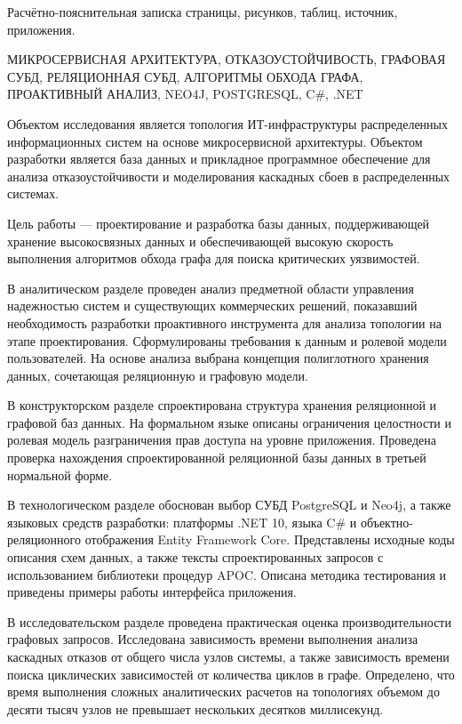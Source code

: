 Расчётно-пояснительная записка \pageref{LastPage} страницы,  рисунков, 
 таблиц,  источник,  приложения.

\noindent
МИКРОСЕРВИСНАЯ АРХИТЕКТУРА, ОТКАЗОУСТОЙЧИВОСТЬ, \newline ГРАФОВАЯ СУБД, РЕЛЯЦИОННАЯ СУБД, 
АЛГОРИТМЫ ОБХОДА ГРАФА, ПРОАКТИВНЫЙ АНАЛИЗ, NEO4J, POSTGRESQL, C\#, .NET 

Объектом исследования является топология ИТ-инфраструктуры распределенных 
информационных систем на основе микросервисной архитектуры.
Объектом разработки является база данных и прикладное программное обеспечение 
для анализа отказоустойчивости и моделирования каскадных сбоев в распределенных 
системах.

Цель работы --- проектирование и разработка базы данных, поддерживающей  
хранение высокосвязных данных и обеспечивающей высокую скорость выполнения 
алгоритмов обхода графа для поиска критических уязвимостей.

В аналитическом разделе проведен анализ предметной области управления надежностью 
систем и существующих коммерческих решений, показавший необходимость разработки 
проактивного инструмента для анализа топологии на этапе проектирования. 
Сформулированы требования к данным и ролевой модели пользователей. На основе 
анализа выбрана концепция полиглотного хранения данных, сочетающая реляционную 
и графовую модели.

В конструкторском разделе спроектирована структура хранения реляционной и графовой 
баз данных. На формальном языке описаны ограничения целостности и ролевая модель 
разграничения прав доступа на уровне приложения. Проведена проверка нахождения 
спроектированной реляционной базы данных в третьей нормальной форме.

В технологическом разделе обоснован выбор СУБД PostgreSQL и Neo4j, а также языковых 
средств разработки: платформы .NET 10, языка C\# и объектно-реляционного отображения 
Entity Framework Core. Представлены исходные коды описания схем данных, а также 
тексты спроектированных запросов с использованием библиотеки процедур APOC. 
Описана методика тестирования и приведены примеры работы интерфейса приложения.

В исследовательском разделе проведена практическая оценка производительности 
графовых запросов. Исследована зависимость времени выполнения анализа каскадных 
отказов от общего числа узлов системы, а также зависимость времени поиска 
циклических зависимостей от количества циклов в графе. Определено, что время 
выполнения сложных аналитических расчетов на топологиях объемом до десяти 
тысяч узлов не превышает нескольких десятков миллисекунд.